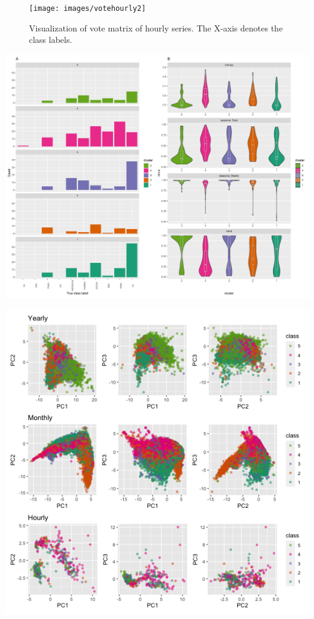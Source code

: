 \documentclass[11pt,a4paper,]{article}
\begin{document}
\clearpage

\begin{figure}[h]

{\centering \texttt{[image: images/votehourly2]} 

}

\caption{Visualization of vote matrix of hourly series. The X-axis denotes the class labels.}\label{fig:unnamed-chunk-3}
\end{figure}

\begin{center}\includegraphics[width=\textwidth]{figure/hourlylabel-1} \end{center}

\clearpage

\begin{center}\includegraphics[width=\textwidth]{figure/pca-1} \end{center}
\end{document}
